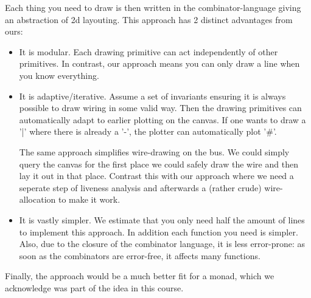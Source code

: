 Each thing you need to draw is then written in the combinator-language
giving an abstraction of 2d layouting. This approach has 2 distinct
advantages from ours:
\begin{itemize}
\item It is modular. Each drawing primitive can act independently of
  other primitives. In contrast, our approach means you can only draw
  a line when you know everything.
\item It is adaptive/iterative. Assume a set of invariants
  ensuring it is always possible to draw wiring in some valid
  way. Then the drawing primitives can automatically adapt to earlier
  plotting on the canvas. If one wants to draw a '|' where there is
  already a '-', the plotter can automatically plot '\#'.

  The same approach simplifies wire-drawing on the bus. We could
  simply query the canvas for the first place we could safely draw the
  wire and then lay it out in that place. Contrast this with our
  approach where we need a seperate step of liveness analysis and
  afterwards a (rather crude) wire-allocation to make it work.
\item It is vastly simpler. We estimate that you only need half the
  amount of lines to implement this approach. In addition each
  function you need is simpler. Also, due to the closure of the
  combinator language, it is less error-prone: as soon as the
  combinators are error-free, it affects many functions.
\end{itemize}
Finally, the approach would be a much better fit for a monad, which we
acknowledge was part of the idea in this course.


